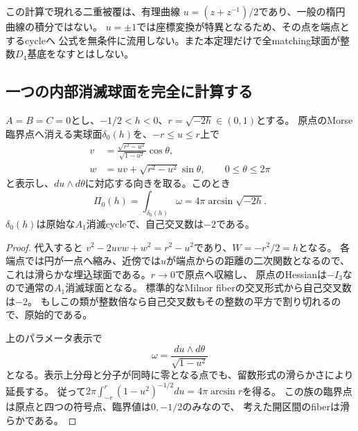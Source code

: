 この計算で現れる二重被覆は、有理曲線
$u=(z+z^{-1})/2$であり、一般の楕円曲線の積分ではない。
$u=\pm1$では座標変換が特異となるため、その点を端点とするcycleへ
公式を無条件に流用しない。また本定理だけで全matching球面が整数$D_4$基底をなすとはしない。

\subsection{一つの内部消滅球面を完全に計算する}
\begin{theorem}[Morse球面の正確な周期]
\label{thm:explicit-morse-period}
$A=B=C=0$とし、$-1/2<h<0$、$r=\sqrt{-2h}\in(0,1)$とする。
原点のMorse臨界点へ消える実球面$\delta_0(h)$を、$-r\le u\le r$上で
\begin{align*}
 v&=\frac{\sqrt{r^2-u^2}}{\sqrt{1-u^2}}\cos\theta,\\
 w&=uv+\sqrt{r^2-u^2}\sin\theta,\qquad 0\le\theta\le2\pi
\end{align*}
と表示し、$du\wedge d\theta$に対応する向きを取る。このとき
\begin{equation}\label{eq:arcsine-period}
 \boxed{\Pi_0(h)=\int_{\delta_0(h)}\omega
       =4\pi\arcsin\sqrt{-2h}}.
\end{equation}
$\delta_0(h)$は原始な$A_1$消滅cycleで、自己交叉数は$-2$である。
\end{theorem}
\begin{proof}
代入すると
$v^2-2uvw+w^2=r^2-u^2$であり、$W=-r^2/2=h$となる。
各端点では円が一点へ縮み、近傍では$u$が端点からの距離の二次関数となるので、
これは滑らかな埋込球面である。$r\to0$で原点へ収縮し、
原点のHessianは$-I_3$なので通常の$A_1$消滅球面となる。
標準的なMilnor fiberの交叉形式から自己交叉数は$-2$。
もしこの類が整数倍なら自己交叉数もその整数の平方で割り切れるので、原始的である。

上のパラメータ表示で
\[
 \omega=\frac{du\wedge d\theta}{\sqrt{1-u^2}}
\]
となる。表示上分母と分子が同時に零となる点でも、留数形式の滑らかさにより延長する。
従って$2\pi\int_{-r}^{r}(1-u^2)^{-1/2}du=4\pi\arcsin r$を得る。
この族の臨界点は原点と四つの符号点、臨界値は$0,-1/2$のみなので、
考えた開区間のfiberは滑らかである。
\end{proof}

